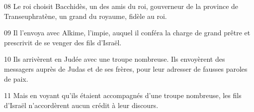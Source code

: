 08 Le roi choisit Bacchidès, un des amis du roi, gouverneur de la province de Transeuphratène, un grand du royaume, fidèle au roi.

09 Il l’envoya avec Alkime, l’impie, auquel il conféra la charge de grand prêtre et prescrivit de se venger des fils d’Israël.

10 Ils arrivèrent en Judée avec une troupe nombreuse. Ils envoyèrent des messagers auprès de Judas et de ses frères, pour leur adresser de fausses paroles de paix.

11 Mais en voyant qu’ils étaient accompagnés d’une troupe nombreuse, les fils d’Israël n’accordèrent aucun crédit à leur discours.
